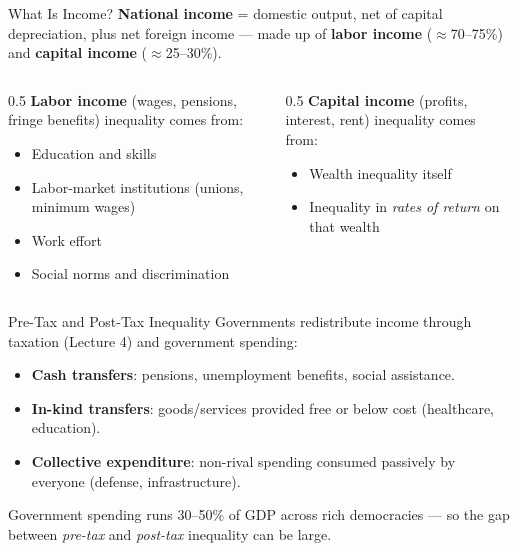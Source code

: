 \documentclass[11pt,aspectratio=169]{beamer}
\begin{document}
\begin{frame}{What Is Income?}
  \small
  \textbf{National income} = domestic output, net of capital depreciation, plus net foreign income --- made up of \textbf{labor income} ($\approx$70--75\%) and \textbf{capital income} ($\approx$25--30\%).
  \vspace{0.3em}
  \begin{columns}[T]
    \begin{column}{0.5\textwidth}
      \textbf{Labor income} (wages, pensions, fringe benefits) inequality comes from:
      \begin{itemize}
        \item Education and skills
        \item Labor-market institutions (unions, minimum wages)
        \item Work effort
        \item Social norms and discrimination
      \end{itemize}
    \end{column}
    \begin{column}{0.5\textwidth}
      \textbf{Capital income} (profits, interest, rent) inequality comes from:
      \begin{itemize}
        \item Wealth inequality itself
        \item Inequality in \emph{rates of return} on that wealth
      \end{itemize}
    \end{column}
  \end{columns}
\end{frame}

\begin{frame}{Pre-Tax and Post-Tax Inequality}
  \small
  Governments redistribute income through taxation (Lecture 4) and government spending:
  \begin{itemize}
    \item \textbf{Cash transfers}: pensions, unemployment benefits, social assistance.
    \item \textbf{In-kind transfers}: goods/services provided free or below cost (healthcare, education).
    \item \textbf{Collective expenditure}: non-rival spending consumed passively by everyone (defense, infrastructure).
  \end{itemize}
  \vspace{0.3em}
  \centering
  Government spending runs 30--50\% of GDP across rich democracies --- so the gap between \emph{pre-tax} and \emph{post-tax} inequality can be large.
\end{frame}
\end{document}
